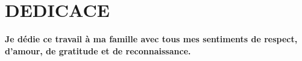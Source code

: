 \chapter*{DEDICACE}
\vspace*{7cm}
\begin{cursive}

{\Huge \bfseries  Je dédie ce travail à ma famille avec tous mes sentiments de respect, d'amour, de gratitude et de
	reconnaissance.}
\end{cursive}